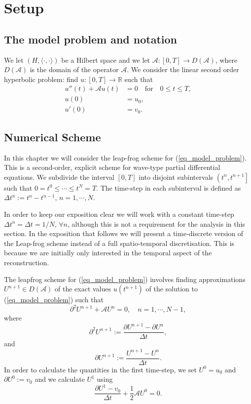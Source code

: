 \documentclass[12pt,a4paper]{article}
\numberwithin{equation}{section}
\theoremstyle{definition}
\newcommand{\qp}[1]{\left(#1\right)}
\newcommand{\qpb}[1]{\left(#1\right]}
\newcommand{\qb}[1]{\left[#1\right]}
\begin{document}
\section{Setup}\label{sec:setup}
\subsection{The model problem and notation}\label{subsec_modelprob}
We let $\qp{H,\langle \cdot,\cdot\rangle}$ be a Hilbert space and we let $\mathcal{A}:\qb{0,T}\rightarrow D\qp{\mathcal{A}}$, where $D\qp{\mathcal{A}}$ is the domain of the operator $\mathcal{A}$.  We consider the linear second order hyperbolic problem: find $u:\qb{0,T}\rightarrow \mathbb{R}$ such that
\begin{equation}\label{eq_model_problem}
\begin{aligned}
u''\qp{t}+\mathcal{A}u\qp{t}&=0\quad\text{for}\quad 0\leq t\leq T,\\
u\qp{0}&=u_0,\\
u'\qp{0}&=v_0.
\end{aligned}
\end{equation}

\subsection{Numerical Scheme}\label{subsect_leapfrog}
In this chapter we will consider  the leap-frog scheme for  (\ref{eq_model_problem}).  This is a second-order, explicit scheme for wave-type partial differential equations.  We  subdivide the interval $\qb{0,T}$ into disjoint subintervals $\qpb{t^n, t^{n+1}}$ such that $0=t^0\leq\cdots\leq t^N=T$. The time-step in each subinterval is defined as $\Delta t^n := t^n-t^{n-1},\, n=1,\cdots,N$. 

In order to keep our exposition clear we will work with a constant time-step  $\Delta t^n = \Delta  t = 1/N ,\, \forall n$, although this is not a requirement for the analysis in this section. 
In the exposition that follows we will present a time-discrete version of the Leap-frog scheme instead of a full spatio-temporal discretisation.  This is because we are initially only interested in the temporal aspect of the reconstruction.  

The leapfrog scheme for (\ref{eq_model_problem}) involves finding approximations $U^{n+1}\in D\qp{\mathcal{A}}$ of the exact values $u\qp{t^{n+1}}$ of the solution to (\ref{eq_model_problem}) such that
\begin{equation}\label{eq_model_discrete}
\partial^2U^{n+1}+\mathcal{A}U^n=0,\quad n= 1,\cdots, N-1, 
\end{equation}
where
\begin{equation}
\partial^2U^{n+1}:=\frac{\partial U^{n+1}-\partial U^n}{\Delta t},
\end{equation}
and 
\begin{equation}
\partial U^{n+1}:= \frac{U^{n+1}-U^n}{\Delta t}.
\end{equation}
In order to calculate the quantities in the first time-step, we set $U^0=u_0$ and $\partial U^0:= v_0$ and we calculate $U^1$ using
\begin{equation}
\frac{\partial U^1 - v_0}{\Delta t} + \frac{1}{2}\mathcal{A}U^0 =0.
\end{equation}
\end{document}
